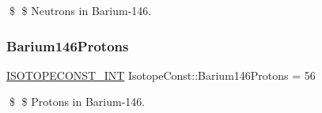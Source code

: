 \$ \$ Neutrons in Barium-\/146. \mbox{\label{group___isotope_const-_barium-_ba146_ga9a57d2466369db99a3f9f27d88d88dc7}} 
\subsubsection{\texorpdfstring{Barium146\+Protons}{Barium146Protons}}
{\footnotesize\ttfamily \mbox{\hyperlink{group___isotope_const-_macros_ga5f18360b3e99483a35c32d789e62621c}{I\+S\+O\+T\+O\+P\+E\+C\+O\+N\+S\+T\+\_\+\+I\+NT}} Isotope\+Const\+::\+Barium146\+Protons = 56}

\$ \$ Protons in Barium-\/146. 